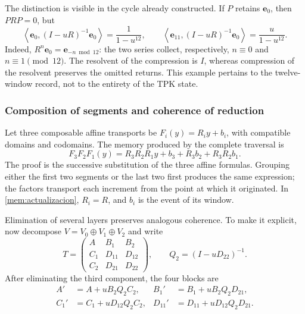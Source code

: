 The distinction is visible in the cycle already constructed. If \(P\) retains
\(\mathbf e_0\), then \(PRP=0\), but
\begin{equation}
 \left\langle\mathbf e_0,(I-uR)^{-1}\mathbf e_0\right\rangle
 =\frac1{1-u^{12}},\qquad
 \left\langle\mathbf e_{11},(I-uR)^{-1}\mathbf e_0\right\rangle
 =\frac u{1-u^{12}}.
 \label{mem:ejemplo-ciclo}
\end{equation}
Indeed, \(R^n\mathbf e_0=\mathbf e_{-n\bmod12}\): the
two series collect, respectively, \(n\equiv0\) and
\(n\equiv1\pmod{12}\). The resolvent of the compression is \(I\),
whereas compression of the resolvent preserves the omitted returns.
This example pertains to the twelve-window record, not to the entirety
of the TPK state.

\subsubsection{Composition of segments and coherence of reduction}

Let three composable affine transports be
\(F_i(y)=R_i y+b_i\), with compatible domains and codomains.
The memory produced by the complete traversal is
\begin{equation}
 F_3F_2F_1(y)
 =R_3R_2R_1y+b_3+R_3b_2+R_3R_2b_1.
 \label{mem:cociclo-tres}
\end{equation}
The proof is the successive substitution of the three affine formulas.
Grouping either the first two segments or the last two first produces
the same expression; the factors transport each increment from
the point at which it originated. In \eqref{mem:actualizacion},
\(R_i=R\), and \(b_i\) is the event of its window.

Elimination of several layers preserves analogous coherence.
To make it explicit, now decompose
\(V=V_0\oplus V_1\oplus V_2\) and write
\[
 T=\begin{pmatrix}
 A&B_1&B_2\\C_1&D_{11}&D_{12}\\C_2&D_{21}&D_{22}
 \end{pmatrix},\qquad Q_2=(I-uD_{22})^{-1}.
\]
After eliminating the third component, the four blocks are
\begin{equation}
 \begin{aligned}
 A'&=A+uB_2Q_2C_2,&
 B_1'&=B_1+uB_2Q_2D_{21},\\
 C_1'&=C_1+uD_{12}Q_2C_2,&
 D_{11}'&=D_{11}+uD_{12}Q_2D_{21}.
 \end{aligned}
 \label{mem:schur-intermedio}
\end{equation}

